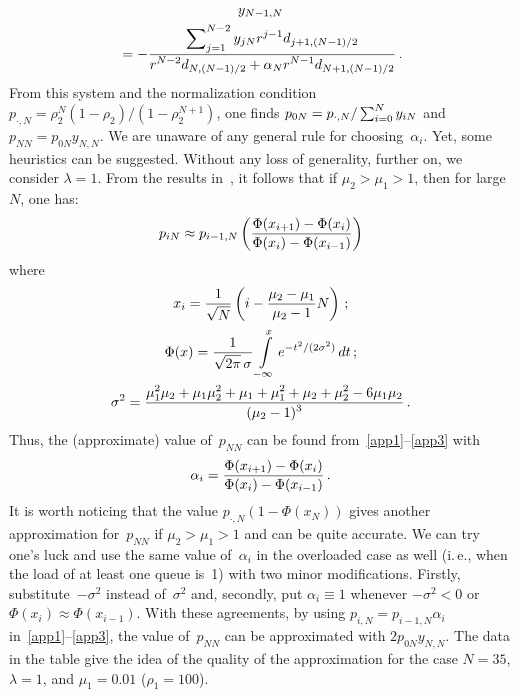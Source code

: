 \begin{multicols}{2}
\noindent
\begin{multline}
\label{app3}
y_{N-1,N} \\
{}= -\displaystyle\frac{\displaystyle  \sum\nolimits_{j=1}^{N-2}
y_{jN} r^{j-1} d_{j+1,(N-1)/2}\mathstrut}{\displaystyle r^{N-2} d_{N,(N-1)/2}+\alpha_{N} r^{N-1} d_{N+1,(N-1)/2}\mathstrut}\,.
\end{multline}
From this system and the normalization condition 
$p_{\cdot,N} = \rho_2^N (1-\rho_2)/ (1- \rho_2^{N+1})$,
one finds $p_{0N}\linebreak =p_{\cdot,N}/\sum_{i=0}^N y_{iN}$ and
$p_{NN}=p_{0N} y_{N,N}$.
We are unaware of any general rule for choosing~$\alpha_i$.
Yet, some heuristics can be suggested. 
Without any loss of generality, further on, we
consider $\lambda=1$.
From the results in~\cite{orig2-1}, it
follows that if $\mu_2>\mu_1>1$,
then for large~$N$, one has:
\begin{equation*}
p_{iN}\approx
p_{i-1,N} \left ( \displaystyle\frac{\displaystyle \Phi(x_{i+1}) - \Phi(x_{i})\mathstrut}{\displaystyle \Phi(x_{i}) - \Phi(x_{i-1})\mathstrut}
\right )
\end{equation*}
where
\begin{gather*}
x_i = \displaystyle\frac{\displaystyle 1\mathstrut}{\displaystyle \sqrt{N}\mathstrut}
\left (i - \displaystyle\frac{\displaystyle \mu_2-\mu_1\mathstrut}{\displaystyle \mu_2-1\mathstrut} N \right )\,;
\\
\Phi(x)=\displaystyle\frac{\displaystyle 1\mathstrut}{\displaystyle \sqrt{2 \pi}\, \sigma\mathstrut}
\int\limits_{-\infty}^x e^{-{t^2}/({2 \sigma^2})}\,dt\,;
\\
\sigma^2= 
\displaystyle\frac{\displaystyle \mu_1^2 \mu_2 + \mu_1 \mu_2^2 + \mu_1 + \mu_1^2 + \mu_2 + \mu_2^2 - 
6 \mu_1 \mu_2 \mathstrut}{\displaystyle (\mu_2-1)^3\mathstrut}\,.
\end{gather*}
Thus, the (approximate) value of~$p_{NN}$ can be found from~\eqref{app1}--\eqref{app3}
with 
$$
\alpha_i=\displaystyle\frac{\displaystyle \Phi(x_{i+1}) - \Phi(x_{i})\mathstrut}{\displaystyle \Phi(x_{i}) - \Phi(x_{i-1})\mathstrut}\,.
$$
It is worth noticing that the value $p_{\cdot,N}(1-\Phi(x_{N}))$
gives another approximation for~$p_{NN}$ if $\mu_2>\mu_1>1$ and
can be quite accurate. We can try one's luck and
use the same value of~$\alpha_i$ in the overloaded case as well 
(i.\,e., when the load of at least one queue is~1)
with two minor modifications. Firstly, substitute~$-\sigma^2$ instead 
of~$\sigma^2$ and, secondly, put $\alpha_i \equiv 1$ whenever 
$-\sigma^2<0$ or $\Phi(x_{i}) \approx \Phi(x_{i-1})$.   
With these agreements, by using $p_{i,N}= p_{i-1,N} \alpha_i$
in~\eqref{app1}--\eqref{app3}, the value of~$p_{NN}$ can be approximated with
$2 p_{0N} y_{N,N}$. The data in the table give the idea of the quality 
of the approximation
for the case $N=35$, $\lambda=1$, and $\mu_1=0.01$ ($\rho_1=100$). 

\vspace*{6pt}


\end{multicols}
